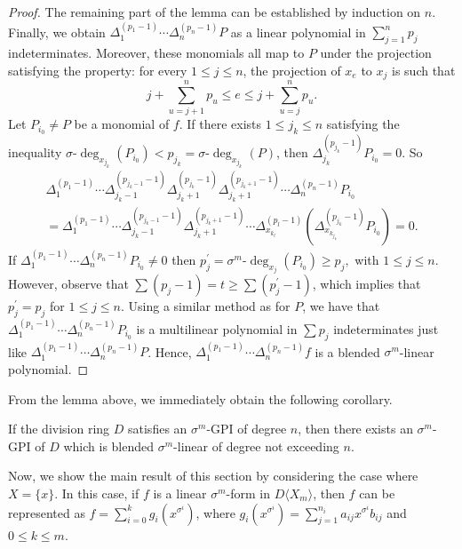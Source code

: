 \documentclass{cimart}
\begin{document}
\begin{proof}
	The remaining part of the lemma can be established by induction on $n$.  Finally, we obtain $\Delta^{(p_1-1)}_{{1}}\cdots \Delta^{(p_n-1)}_{n} P$ as a linear polynomial in $\sum^{n}_{j=1} p_j$ indeterminates. Moreover, these monomials all map to $P$ under the projection satisfying the property: for every $1\leq j\leq n$, the projection of $x_{e}$ to $x_{j}$ is such that $$  j+\sum_{u=j+1}^{n} p_u\leq  e\leq j+\sum_{u=j}^{n} p_u.$$
	Let $ P_{i_0}\ne P$ be a monomial of $f$. If  there exists  $1\leq j_k\leq n$ satisfying the inequality  $\sigma $-$\deg_{x_{{j_k}}}(P_{i_0})< p_{j_k}=\sigma$-$\deg_{x_{j_k}}(P) $, then $\Delta_{{j_k}}^{(p_{j_k}-1)}P_{i_0}=0 $. So 
	\begin{multline*}
	\Delta^{(p_1-1)}_{{1}}\cdots\Delta^{(p_{j_k-1}-1)}_{j_k-1}\Delta^{(p_{j_k}-1)}_{j_k+1}\Delta^{(p_{j_k+1}-1)}_{j_k+1}\cdots \Delta^{(p_n-1)}_{n} P_{i_0} \\ 
	= \Delta^{(p_1-1)}_{{1}}\cdots\Delta^{(p_{j_k-1}-1)}_{j_k-1}\Delta^{(p_{j_k+1}-1)}_{j_k+1}\cdots \Delta^{(p_l-1)}_{x_{k_l}}  \left(\Delta^{(p_{j_k}-1)}_{x_{k_{j_k}}} P_{i_0}\right) =0.
	\end{multline*}    
	If $\Delta^{(p_1-1)}_{1}\cdots \Delta^{(p_n-1)}_{{n}} P_{i_0}\ne 0$ then $p_j^{'}=\sigma^m$-$\deg_{x_j}(P_{i_0})\geq p_j ,$ with $1\leq j\leq n. $ However, observe that $\sum (p_j-1)=t\geq \sum (p^{'}_j-1)$, which implies that $ p^{'}_{j}=p_j$ for $1\leq j\leq n.$ Using a similar method as for $P$, we have that $\Delta^{(p_1-1)}_{1}\cdots \Delta^{(p_n-1)}_{{n}} P_{i_0}$ is a multilinear polynomial in $\sum p_j$  indeterminates just like $\Delta^{(p_1-1)}_{1}\cdots \Delta^{(p_n-1)}_{n} P$. Hence, $\Delta^{(p_1-1)}_{1}\cdots \Delta^{(p_n-1)}_{{n}} f$ is a blended $\sigma^m$-linear polynomial.
\end{proof}

From the lemma above, we immediately obtain the following corollary.
\begin{corollary} \label{2.3}
	If the division ring $D$ satisfies an $\sigma^m$-GPI of degree $n$, then there exists an $\sigma^m$-GPI of $D$ which is blended $\sigma^m$-linear of degree not exceeding $n$.
\end{corollary}

Now, we show the main result of this section by considering the case where $X=\{x\}$. In this case, if $f$ is a linear $\sigma^m$-form in $D\langle X_m\rangle$, then $f$ can be represented as $f=\sum_{i=0}^k g_i(x^{\sigma^i})$, where $g_i(x^{\sigma^i})=\sum_{j=1}^{n_i} a_{ij}x^{\sigma^i}b_{ij}$ and $0\leq k\leq m$.
\end{document}
